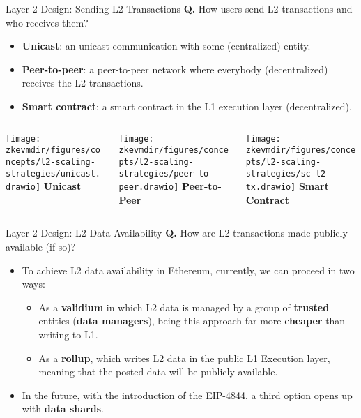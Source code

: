 \begin{frame}{Layer 2 Design: Sending L2 Transactions}
\textbf{Q.} How users send L2 transactions and who receives them?
  \begin{itemize}
  \item \textbf{Unicast}: an unicast communication with some (centralized) entity.
  \item \textbf{Peer-to-peer}: a peer-to-peer network where everybody (decentralized) receives the L2 transactions.
  \item \textbf{Smart contract}: a smart contract in the L1 execution layer (decentralized).
  \end{itemize}

\vspace{1em}

\begin{columns}[t]

\begin{column}{0.3 \textwidth}
\centering
\texttt{[image: \\zkevmdir/figures/concepts/l2-scaling-strategies/unicast.drawio]}
\textbf{Unicast}
\end{column}

\begin{column}{0.3 \textwidth}
\centering
\texttt{[image: \\zkevmdir/figures/concepts/l2-scaling-strategies/peer-to-peer.drawio]}
\textbf{Peer-to-Peer}
\end{column}

\begin{column}{0.3 \textwidth}
\centering
\texttt{[image: \\zkevmdir/figures/concepts/l2-scaling-strategies/sc-l2-tx.drawio]}
\textbf{Smart Contract}
\end{column}

\end{columns}

\end{frame}




\begin{frame}{Layer 2 Design: L2 Data Availability}
\textbf{Q.} How are L2 transactions made publicly available (if so)?
\begin{itemize}
\item To achieve L2 data availability in Ethereum, currently, we can proceed in two ways:
  \begin{itemize}
  \item As a \textbf{validium} in which L2 data is managed by a group of \textbf{trusted} entities (\textbf{data managers}), being
  this approach far more \textbf{cheaper} than writing to L1.
  \item As a \textbf{rollup}, which writes L2 data in the public L1 Execution layer, meaning that the posted data will be publicly available.
  \end{itemize}
\item In the future, with the introduction of the EIP-4844, a third option opens up with \textbf{data shards}.
\end{itemize}
\end{frame}


